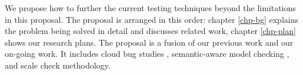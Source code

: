 We propose how to further the current testing techniques beyond the limitations
in this proposal. The proposal is arranged in this order: chapter \ref{chp-bg}
explains the problem being solved in detail and discusses related work, chapter
\ref{chp-plan} shows our research plans.
%
The proposal is a fusion of our previous work and our on-going work. It includes
cloud bug studies \cite{Gunawi+14-Cbs, Leesatapornwongsa+16-TaxDC},
semantic-aware model checking \cite{Leesatapornwongsa+14-Samc}, and scale check
methodology.

